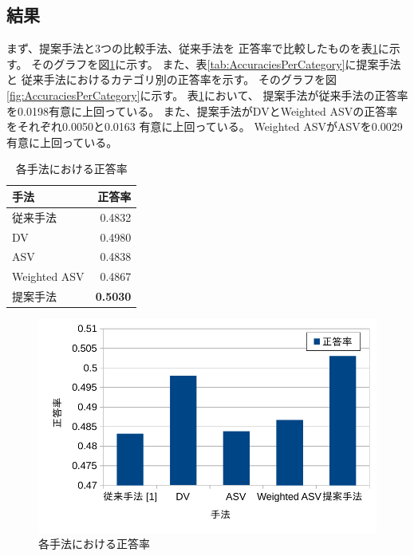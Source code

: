 \subsection{結果}

まず、提案手法と3つの比較手法、従来手法\cite{fujitani15}を
正答率で比較したものを表\ref{tab:AccuraciesOfMethods}に示す。
そのグラフを図\ref{fig:AccuraciesOfMethods}に示す。
また、表\ref{tab:AccuraciesPerCategory}に提案手法と
従来手法におけるカテゴリ別の正答率を示す。
そのグラフを図\ref{fig:AccuraciesPerCategory}に示す。
表\ref{tab:AccuraciesOfMethods}において、
提案手法が従来手法の正答率を0.0198有意に上回っている。
また、提案手法がDVとWeighted ASVの正答率をそれぞれ0.0050と0.0163
有意に上回っている。
Weighted ASVがASVを0.0029有意に上回っている。

\begin{table}
  \caption{各手法における正答率}
  \centering
  \begin{tabular}{l | r} \label{tab:AccuraciesOfMethods}
    手法 & 正答率 \\
    \hline
    従来手法\cite{fujitani15} & 0.4832 \\
    DV & 0.4980 \\
    ASV & 0.4838 \\
    Weighted ASV & 0.4867 \\
    提案手法 & \textbf{0.5030} \\
  \end{tabular}
\end{table}

\begin{figure}
  \includegraphics{fig/graph_of_accuracies_of_methods.pdf}
  \caption{各手法における正答率}
  \label{fig:AccuraciesOfMethods}
\end{figure}

